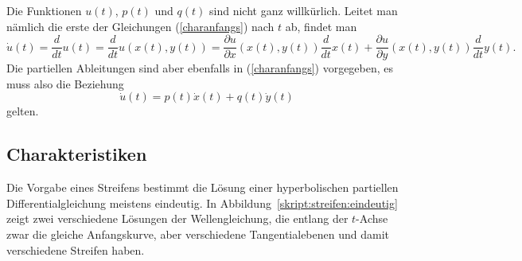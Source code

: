 Die Funktionen $u(t)$, $p(t)$ und $q(t)$ sind nicht ganz willkürlich.
Leitet man nämlich die erste der Gleichungen (\ref{charanfangs}) nach
$t$ ab, findet man
\[
\dot{u}(t)=\frac{d}{dt}u(t)
=
\frac{d}{dt}u(x(t),y(t))
=
\frac{\partial u}{\partial x}(x(t), y(t))\frac{d}{dt}x(t)
+
\frac{\partial u}{\partial y}(x(t), y(t))\frac{d}{dt}y(t).
\]
Die partiellen Ableitungen sind aber ebenfalls in (\ref{charanfangs})
vorgegeben, es muss also die Beziehung
\begin{equation}
\dot{u}(t)= p(t)\dot{x}(t) + q(t)\dot{y}(t)
\label{cauchydatarestriction}
\end{equation}
gelten.

\subsection{Charakteristiken}
Die Vorgabe eines Streifens bestimmt die Lösung einer hyperbolischen
partiellen Differentialgleichung meistens eindeutig.
In Abbildung~\ref{skript:streifen:eindeutig} zeigt zwei verschiedene
Lösungen der Wellengleichung, die entlang der $t$-Achse zwar die
gleiche Anfangskurve, aber verschiedene Tangentialebenen und damit
verschiedene Streifen haben.

